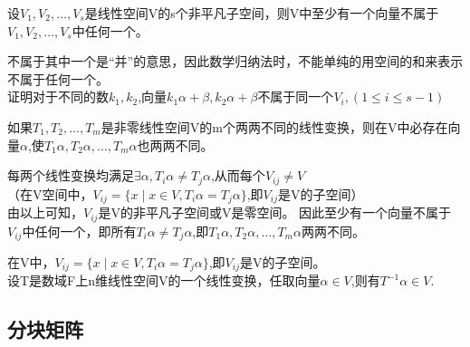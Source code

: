 \documentclass{ctexart}
\begin{document}
\begin{theorem}
    设$V_1,V_2,\ldots ,V_s$是线性空间V的s个非平凡子空间，则V中至少有一个向量不属于$V_1,V_2,\ldots ,V_s$中任何一个。
\end{theorem}
\noindent 不属于其中一个是“并”的意思，因此数学归纳法时，不能单纯的用空间的和来表示不属于任何一个。\\
证明对于不同的数$k_1,k_2$,向量$k_1\alpha +\beta ,k_2\alpha +\beta $不属于同一个$V_i,(1\leq i\leq s-1)$
\begin{theorem}
    如果$T_1,T_2,\ldots ,T_m$是非零线性空间V的m个两两不同的线性变换，则在V中必存在向量$\alpha $,使$T_1\alpha ,T_2\alpha ,\ldots,T_m\alpha $也两两不同。
\end{theorem}
\noindent 每两个线性变换均满足$\exists \alpha,T_i\alpha \neq T_j\alpha$,从而每个$V_{ij}\neq V$\\
（在V空间中，$V_{ij}=\{x\mid x\in V,T_i \alpha=T_j \alpha\}$,即$V_{ij}$是V的子空间）\\
  由以上可知，$V_{ij}$是V的非平凡子空间或V是零空间。
因此至少有一个向量不属于$V_{ij}$中任何一个，即所有$T_i\alpha \neq T_j\alpha$,即$T_1\alpha ,T_2\alpha ,\ldots,T_m\alpha $两两不同。

\begin{proposition}
    在V中，$V_{ij}=\{x\mid x\in V,T_i \alpha=T_j \alpha\}$,即$V_{ij}$是V的子空间。\\
    设T是数域F上n维线性空间V的一个线性变换，任取向量$\alpha\in V$,则有$T^{-1}\alpha\in V.$             
\end{proposition}

\subsection{分块矩阵}
\end{document}

